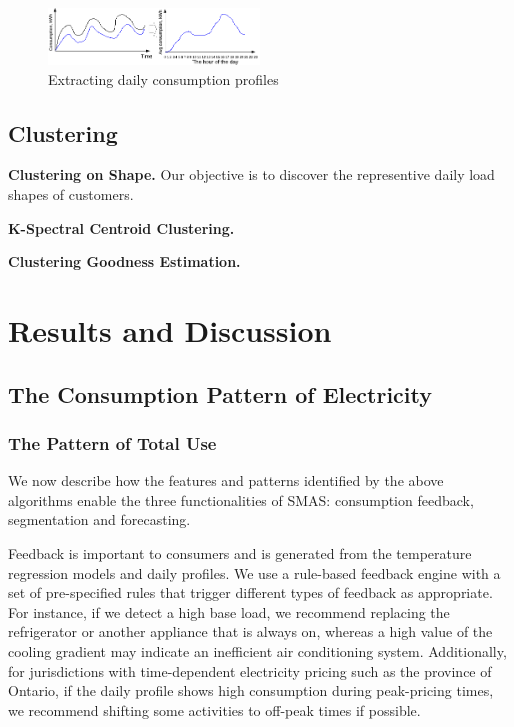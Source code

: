 \documentclass{sig-alternate}
\begin{document}
 \begin{figure}[t]
\centering
\includegraphics[width=0.5\textwidth]{images/dailyprofile}
\caption{Extracting daily consumption profiles}
\label{fig:dailyprofile}
\end{figure}

\subsection{Clustering}
{\bf Clustering on Shape.}
Our objective is to discover the representive daily load shapes of customers. 

{\bf K-Spectral Centroid Clustering.}

{\bf Clustering Goodness Estimation.}

\section{Results and Discussion}




\subsection{The Consumption Pattern of Electricity}

\subsubsection{The Pattern of Total Use}
We now describe how the features and patterns identified by the above algorithms enable the three functionalities of SMAS: consumption feedback, segmentation and forecasting. 

Feedback is important to consumers and is generated from the temperature regression models and daily profiles.  We use a rule-based feedback engine with a set of pre-specified rules that trigger different types of feedback as appropriate.  For instance, if we detect a high base load, we recommend replacing the refrigerator or another appliance that is always on, whereas a high value of the cooling gradient may indicate an inefficient air conditioning system.  Additionally, for jurisdictions with time-dependent electricity pricing such as the province of Ontario, if the daily profile shows high consumption during peak-pricing times, we recommend shifting some activities to off-peak times if possible.
\end{document}
